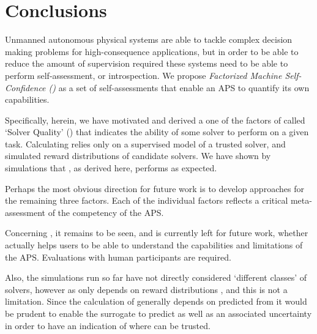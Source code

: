 \section{Conclusions} \label{sec:conclusions}
Unmanned autonomous physical systems are able to tackle complex decision making problems for high-consequence applications, but in order to be able to reduce the amount of supervision required these systems need to be able to perform self-assessment, or introspection. We propose \emph{Factorized Machine Self-Confidence (\famsec)} as a set of self-assessments that enable an APS to quantify its own capabilities.

Specifically, herein, we have motivated and derived a one of the factors of \famsec{} called `Solver Quality' (\xQ) that indicates the ability of some solver to perform on a given task. Calculating \xQ{} relies only on a supervised model of a trusted solver, and simulated reward distributions of candidate solvers. We have shown by simulations that \xQ{}, as derived here, performs as expected.

Perhaps the most obvious direction for future work is to develop approaches for the remaining three \famsec{} factors. Each of the individual factors reflects a critical meta-assessment of the competency of the APS.

Concerning \xQ{}, it remains to be seen, and is currently left for future work, whether \xQ{} actually helps users to be able to understand the capabilities and limitations of the APS. Evaluations with human participants are required.

Also, the simulations run so far have not directly considered `different classes' of solvers, however as \xQ{} only depends on reward distributions \rwd{}, and \rwdstar{} this is not a limitation. Since the calculation of \xQ{} generally depends on \rwdstar{} predicted from \surrogate{} it would be prudent to enable the surrogate to predict \rwdstar{} as well as an associated uncertainty in order to have an indication of where \surrogate{} can be trusted.
